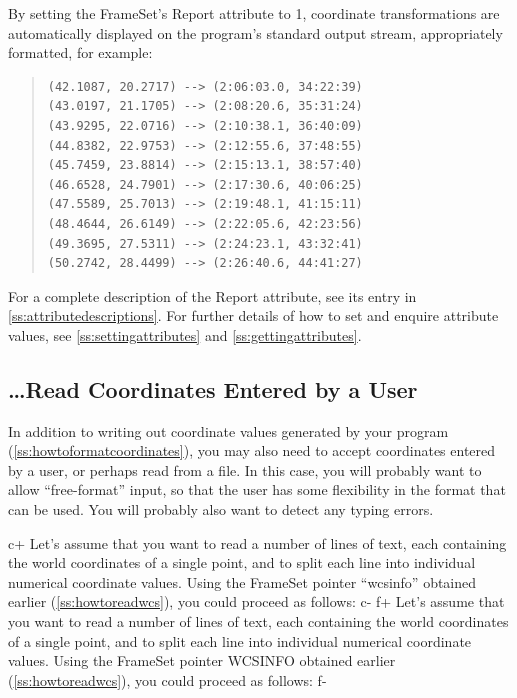 \documentclass[twoside,11pt]{article}
\newcommand{\appref}[1]{Appendix~\ref{#1}}
\newcommand{\secref}[1]{\S\ref{#1}}
\renewcommand{\appref}[1]{\ref{#1}}
\renewcommand{\secref}[1]{\ref{#1}}
\begin{document}
By setting the FrameSet's Report attribute to 1, coordinate
transformations are automatically displayed on the program's standard
output stream, appropriately formatted, for example:

\begin{quote}
\begin{verbatim}
(42.1087, 20.2717) --> (2:06:03.0, 34:22:39)
(43.0197, 21.1705) --> (2:08:20.6, 35:31:24)
(43.9295, 22.0716) --> (2:10:38.1, 36:40:09)
(44.8382, 22.9753) --> (2:12:55.6, 37:48:55)
(45.7459, 23.8814) --> (2:15:13.1, 38:57:40)
(46.6528, 24.7901) --> (2:17:30.6, 40:06:25)
(47.5589, 25.7013) --> (2:19:48.1, 41:15:11)
(48.4644, 26.6149) --> (2:22:05.6, 42:23:56)
(49.3695, 27.5311) --> (2:24:23.1, 43:32:41)
(50.2742, 28.4499) --> (2:26:40.6, 44:41:27)
\end{verbatim}
\end{quote}

For a complete description of the Report attribute, see its entry in
\appref{ss:attributedescriptions}.  For further details of how to set
and enquire attribute values, see \secref{ss:settingattributes} and
\secref{ss:gettingattributes}.

\subsection{\ldots Read Coordinates Entered by a User}

In addition to writing out coordinate values generated by your program
(\secref{ss:howtoformatcoordinates}), you may also need to accept
coordinates entered by a user, or perhaps read from a file. In this
case, you will probably want to allow ``free-format'' input, so that
the user has some flexibility in the format that can be used. You will
probably also want to detect any typing errors.

c+
Let's assume that you want to read a number of lines of text, each
containing the world coordinates of a single point, and to split each
line into individual numerical coordinate values. Using the FrameSet
pointer ``wcsinfo'' obtained earlier (\secref{ss:howtoreadwcs}), you
could proceed as follows:
c-
f+
Let's assume that you want to read a number of lines of text, each
containing the world coordinates of a single point, and to split each
line into individual numerical coordinate values. Using the FrameSet
pointer WCSINFO obtained earlier (\secref{ss:howtoreadwcs}), you could
proceed as follows:
f-
\end{document}
